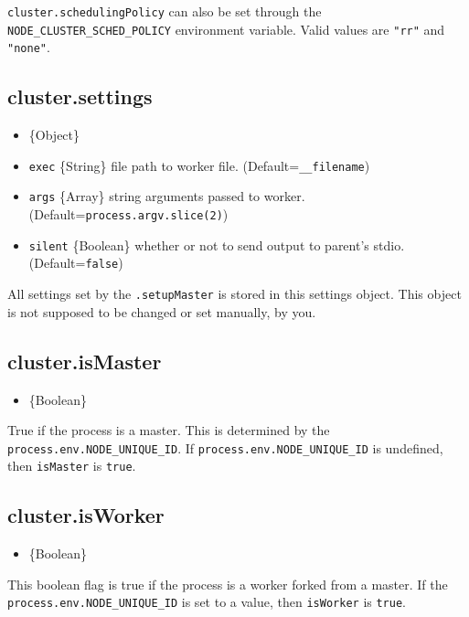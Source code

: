 \texttt{cluster.schedulingPolicy} can also be set through the
\texttt{NODE\_CLUSTER\_SCHED\_POLICY} environment variable. Valid values
are \texttt{"rr"} and \texttt{"none"}.

\subsection{cluster.settings}

\begin{itemize}
\item
  \{Object\}
\item
  \texttt{exec} \{String\} file path to worker file.
  (Default=\texttt{\_\_filename})
\item
  \texttt{args} \{Array\} string arguments passed to worker.
  (Default=\texttt{process.argv.slice(2)})
\item
  \texttt{silent} \{Boolean\} whether or not to send output to parent's
  stdio. (Default=\texttt{false})
\end{itemize}

All settings set by the \texttt{.setupMaster} is stored in this settings
object. This object is not supposed to be changed or set manually, by
you.

\subsection{cluster.isMaster}

\begin{itemize}
\item
  \{Boolean\}
\end{itemize}

True if the process is a master. This is determined by the
\texttt{process.env.NODE\_UNIQUE\_ID}. If
\texttt{process.env.NODE\_UNIQUE\_ID} is undefined, then
\texttt{isMaster} is \texttt{true}.

\subsection{cluster.isWorker}

\begin{itemize}
\item
  \{Boolean\}
\end{itemize}

This boolean flag is true if the process is a worker forked from a
master. If the \texttt{process.env.NODE\_UNIQUE\_ID} is set to a value,
then \texttt{isWorker} is \texttt{true}.

